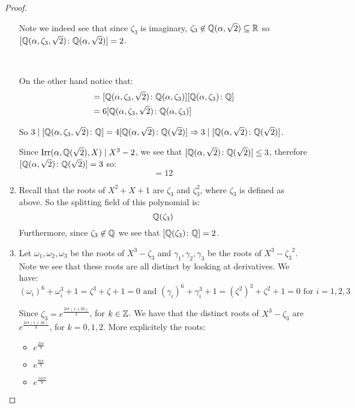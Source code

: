 \begin{exercise}
\begin{proof}
\begin{enumerate}[label=(\alph*)]
        Note we indeed see that since $\zeta_3$ is imaginary, $\zeta_3\not\in \mathbb{Q}(\alpha, \sqrt{2})\subseteq\mathbb{R}$ so $[\mathbb{Q}(\alpha, \zeta_3,\sqrt{2})\colon \mathbb{Q}(\alpha, \sqrt{2})] = 2$.

        \

        On the other hand notice that:\begin{align*}
            [\Q(\alpha, \zeta_3,\sqrt{2})\colon \Q] &= [\Q(\alpha, \zeta_3,\sqrt{2})\colon \Q(\alpha, \zeta_3)][\Q(\alpha, \zeta_3)\colon \Q]\\
             &= 6[\Q(\alpha, \zeta_3,\sqrt{2})\colon \Q(\alpha, \zeta_3)]
        \end{align*}

        So $3\mid [\mathbb{Q}(\alpha, \zeta_3,\sqrt{2})\colon \mathbb{Q}] = 4[\mathbb{Q}(\alpha,\sqrt{2})\colon \mathbb{Q}(\sqrt{2})]\Rightarrow 3\mid [\mathbb{Q}(\alpha,\sqrt{2})\colon \mathbb{Q}(\sqrt{2})]$.

        Since $\text{Irr}(\alpha, \mathbb{Q}(\sqrt{2}), X)\mid X^3-2$, we see that $[\mathbb{Q}(\alpha,\sqrt{2})\colon \mathbb{Q}(\sqrt{2})]\leq 3$, therefore $[\mathbb{Q}(\alpha,\sqrt{2})\colon \mathbb{Q}(\sqrt{2})]=3$ so:\begin{equation}
            [\Q(\alpha, \zeta_3,\sqrt{2})\colon \Q] = 12
        \end{equation}
        \item Recall that the roots of $X^2+X+1$ are $\zeta_3$ and $\zeta_3^2$, where $\zeta_3$ is defined as above. So the splitting field of this polynomial is:\begin{equation}
            \mathbb{Q}(\zeta_3)
        \end{equation}
        Furthermore, since $\zeta_3\not\in \mathbb{Q}$ we see that $[\mathbb{Q}(\zeta_3)\colon \mathbb{Q}] = 2$.
        \item Let $\omega_1,\omega_2,\omega_3$ be the roots of $X^3 - \zeta_3$ and $\gamma_1,\gamma_2,\gamma_3$ be the roots of $X^3-{\zeta_3}^2$. Note we see that these roots are all distinct by looking at derivatives.
        We have: \begin{equation}
            {(\omega_i)}^6+\omega_i^3+1 = \zeta^3+\zeta+1 = 0 \text{ and } {(\gamma_i)}^6+\gamma_i^3+1 = {(\zeta^2)}^3+\zeta^2+1 = 0 \text{ for }i=1,2,3
        \end{equation}

       Since $\zeta_3 = e^{\frac{2i\pi(1+3k)}{3}}$, for $k\in\mathbb{Z}$. We have that the distinct roots of $X^3-\zeta_3$ are $e^{\frac{2i\pi(1+3k)}{9}}$, for $k=0,1,2$. More explicitely the roots:\begin{itemize}
        \item $e^{\frac{2i\pi}{9}}$
        \item $e^{\frac{8i\pi}{9}}$
        \item $e^{\frac{14i\pi}{9}}$
       \end{itemize}


\end{enumerate}
\end{proof}
\end{exercise}
